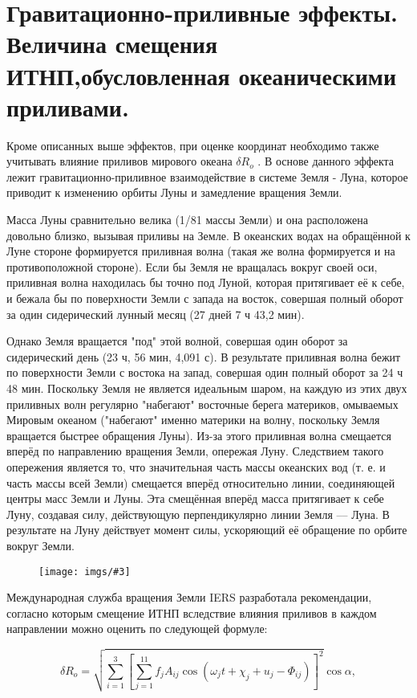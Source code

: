 \documentclass[14pt,a4paper,oneside]{extarticle}
\newcommand{\pic}[3]{
	\begin{figure}[#1]
		\begin{center}
			\texttt{[image: imgs/\#3]}
		\end{center}
	\end{figure}
}
\begin{document}
\section{Гравитационно-приливные эффекты. Величина смещения ИТНП,обусловленная океаническими приливами.}

Кроме описанных выше эффектов, при оценке координат необходимо также учитывать влияние приливов мирового океана $ \delta R_o $ . В основе данного эффекта лежит гравитационно-приливное взаимодействие в системе Земля - Луна, которое приводит к изменению орбиты Луны и замедление вращения Земли.

Масса Луны сравнительно велика (1/81 массы Земли) и она расположена довольно близко, вызывая приливы на Земле. В океанских водах на обращённой к Луне стороне формируется приливная волна (такая же волна формируется и на противоположной стороне).
Если бы Земля не вращалась вокруг своей оси, приливная волна находилась бы точно под Луной, которая притягивает её к себе, и бежала бы по поверхности Земли с запада на восток, совершая полный оборот за один сидерический лунный месяц (27 дней 7 ч 43,2 мин).

Однако Земля вращается "под" этой волной, совершая один оборот за сидерический день (23 ч, 56 мин, 4,091 с).
В результате приливная волна бежит по поверхности Земли с востока на запад, совершая один полный оборот за 24 ч 48 мин.
Поскольку Земля не является идеальным шаром, на каждую из этих двух приливных волн регулярно "набегают" восточные берега материков, омываемых Мировым океаном ("набегают" именно материки на волну, поскольку Земля вращается быстрее обращения Луны). 
Из-за этого приливная волна смещается вперёд по направлению вращения Земли, опережая Луну. Следствием такого опережения является то, что значительная часть массы океанских вод (т. е. и часть массы всей Земли) смещается вперёд относительно линии, соединяющей центры масс Земли и Луны.
Эта смещённая вперёд масса притягивает к себе Луну, создавая силу, действующую перпендикулярно линии Земля –– Луна.
В результате на Луну действует момент силы, ускоряющий её обращение по орбите вокруг Земли.

\pic{H}{\textwidth}{11}

Международная служба вращения Земли IERS разработала рекомендации, согласно которым смещение ИТНП вследствие влияния приливов в каждом направлении можно оценить по следующей формуле:

\[\delta R_o =\sqrt{\sum_{i=1}^{3}\left[\sum_{j=1}^{11}f_{j}A_{ij}\cos(\omega_{j}t+\chi_{j}+u_{j}-\Phi_{ij})\right]^{2}}\cos\alpha,\]
\end{document}
